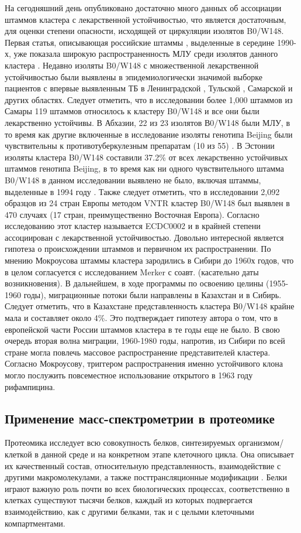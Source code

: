 На сегодняшний день опубликовано достаточно много данных об ассоциации штаммов кластера с лекарственной устойчивостью, что является достаточным, для оценки степени опасности, исходящей от циркуляции изолятов B0/W148. Первая статья, описывающая российские штаммы , выделенные в середине 1990-х, уже показала широкую распространенность МЛУ среди изолятов данного кластера \cite{marttila1998ser315thr}. Недавно изоляты B0/W148 с множественной лекарственной устойчивостью были выявлены в эпидемиологически значимой выборке пациентов с впервые выявленным ТБ в Ленинградской \cite{tratata123}, Тульской \cite{dubiley2010molecular}, Самарской и других областях. Следует отметить, что в исследовании более 1,000 штаммов из Самары 119 штаммов относилось к кластеру B0/W148 и все они были лекарственно устойчивы. В Абхазии, 22 из 23 изолятов В0/W148 были МЛУ, в то время как другие включенные в исследование изоляты генотипа Beijing были чувствительны к противотуберкулезным препаратам (10 из 55) \cite{pardini2009characteristics}. В Эстонии изоляты кластера B0/W148 составили 37.2\% от всех лекарственно устойчивых штаммов генотипа Beijing, в то время как ни одного чувствительного штамма B0/W148 в данном исследовании выявлено не было, включая штаммы, выделенные в 1994 году \cite{kruuner2001spread}. Также следует отметить, что в исследовании 2,092 образцов из 24 стран Европы методом VNTR кластер B0/W148 был выявлен в 470 случаях (17 стран, преимущественно Восточная Европа). Согласно исследованию этот кластер называется ECDC0002 и в крайней степени ассоциирован с лекарственной устойчивостью.
Довольно интересной является гипотеза о происхождении штаммов и первичном их распространении. По мнению Мокроусова штаммы кластера зародились в Сибири до 1960х годов, что в целом согласуется с исследованием Merker с соавт. (касательно даты возникновения). В дальнейшем, в ходе программы по освоению целины (1955-1960 годы), миграционные потоки были направлены в Казахстан и в Сибирь. Следует отметить, что в Казахстане представленность кластера В0/W148 крайне мала и составляет около 4\%. Это подтверждает гипотезу автора о том, что в европейской части России штаммов кластера в те годы еще не было. В свою очередь вторая волна миграции, 1960-1980 годы, напротив, из Сибири по всей стране могла повлечь массовое распространение представителей кластера. Согласно Мокроусову, триггером распространения именно устойчивого клона могло послужить повсеместное использование открытого в 1963 году рифампицина.
 
\subsection{Применение масс-спектрометрии в протеомике}
Протеомика исследует всю совокупность белков, синтезируемых организмом/клеткой в данной среде и на конкретном этапе клеточного цикла. Она описывает их качественный состав, относительную представленность, взаимодействие с другими макромолекулами, а также посттрансляционные модификации \cite{haekkinen2000cell, molloy2002proteomics, monteoliva2004differential}. Белки играют важную роль почти во всех биологических процессах, соответственно в клетках существуют тысячи белков, каждый из которых подвергается взаимодействию, как с другими белками, так и с целыми клеточными компартментами.

